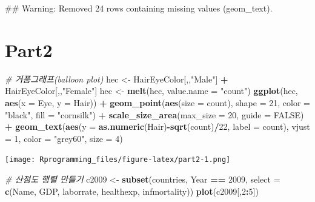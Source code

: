 \documentclass[10pt,]{krantz}
\makeatletter
\newenvironment{Shaded}{\begin{snugshade}}{\end{snugshade}}
\newcommand{\KeywordTok}[1]{\textcolor[rgb]{0.13,0.29,0.53}{\textbf{#1}}}
\newcommand{\DataTypeTok}[1]{\textcolor[rgb]{0.13,0.29,0.53}{#1}}
\newcommand{\DecValTok}[1]{\textcolor[rgb]{0.00,0.00,0.81}{#1}}
\newcommand{\StringTok}[1]{\textcolor[rgb]{0.31,0.60,0.02}{#1}}
\newcommand{\CommentTok}[1]{\textcolor[rgb]{0.56,0.35,0.01}{\textit{#1}}}
\newcommand{\OtherTok}[1]{\textcolor[rgb]{0.56,0.35,0.01}{#1}}
\newcommand{\OperatorTok}[1]{\textcolor[rgb]{0.81,0.36,0.00}{\textbf{#1}}}
\newcommand{\NormalTok}[1]{#1}
\newenvironment{kframe}{%
\medskip{}
\setlength{\fboxsep}{.8em}
 \def\at@end@of@kframe{}%
 \ifinner\ifhmode%
  \def\at@end@of@kframe{\end{minipage}}%
  \begin{minipage}{\columnwidth}%
 \fi\fi%
 \def\FrameCommand##1{\hskip\@totalleftmargin \hskip-\fboxsep
 \colorbox{shadecolor}{##1}\hskip-\fboxsep
     \hskip-\linewidth \hskip-\@totalleftmargin \hskip\columnwidth}%
 \MakeFramed {\advance\hsize-\width
   \@totalleftmargin\z@ \linewidth\hsize
   \@setminipage}}%
 {\par\unskip\endMakeFramed%
 \at@end@of@kframe}
\renewenvironment{Shaded}{\begin{kframe}}{\end{kframe}}
\theoremstyle{definition}
\theoremstyle{definition}
\theoremstyle{remark}
\makeatother
\begin{document}
\begin{Shaded}
\begin{Highlighting}[]
\NormalTok{## Warning: Removed 24 rows containing missing values (geom_text).}
\end{Highlighting}
\end{Shaded}

\section{Part2}\label{part2}

\begin{Shaded}
\begin{Highlighting}[]

\CommentTok{# 거품그래프(balloon plot)}
\NormalTok{hec <-}\StringTok{ }\NormalTok{HairEyeColor[,,}\StringTok{"Male"}\NormalTok{] }\OperatorTok{+}\StringTok{ }\NormalTok{HairEyeColor[,,}\StringTok{"Female"}\NormalTok{]}
\NormalTok{hec <-}\StringTok{ }\KeywordTok{melt}\NormalTok{(hec, }\DataTypeTok{value.name =} \StringTok{"count"}\NormalTok{) }
\KeywordTok{ggplot}\NormalTok{(hec, }\KeywordTok{aes}\NormalTok{(}\DataTypeTok{x =}\NormalTok{ Eye, }\DataTypeTok{y =}\NormalTok{ Hair)) }\OperatorTok{+}\StringTok{ }\KeywordTok{geom_point}\NormalTok{(}\KeywordTok{aes}\NormalTok{(}\DataTypeTok{size =}\NormalTok{ count), }\DataTypeTok{shape =} \DecValTok{21}\NormalTok{, }\DataTypeTok{color =} \StringTok{"black"}\NormalTok{, }\DataTypeTok{fill =} \StringTok{"cornsilk"}\NormalTok{) }\OperatorTok{+}\StringTok{ }
\StringTok{  }\KeywordTok{scale_size_area}\NormalTok{(}\DataTypeTok{max_size =} \DecValTok{20}\NormalTok{, }\DataTypeTok{guide =} \OtherTok{FALSE}\NormalTok{) }\OperatorTok{+}\StringTok{ }
\StringTok{  }\KeywordTok{geom_text}\NormalTok{(}\KeywordTok{aes}\NormalTok{(}\DataTypeTok{y =} \KeywordTok{as.numeric}\NormalTok{(Hair)}\OperatorTok{-}\KeywordTok{sqrt}\NormalTok{(count)}\OperatorTok{/}\DecValTok{22}\NormalTok{, }\DataTypeTok{label =}\NormalTok{ count), }\DataTypeTok{vjust =} \DecValTok{1}\NormalTok{, }\DataTypeTok{color =} \StringTok{"grey60"}\NormalTok{, }\DataTypeTok{size =} \DecValTok{4}\NormalTok{)}
\end{Highlighting}
\end{Shaded}

\texttt{[image: Rprogramming\_files/figure-latex/part2-1.png]}

\begin{Shaded}
\begin{Highlighting}[]


\CommentTok{# 산점도 행렬 만들기}
\NormalTok{c2009 <-}\StringTok{ }\KeywordTok{subset}\NormalTok{(countries, Year }\OperatorTok{==}\StringTok{ }\DecValTok{2009}\NormalTok{, }\DataTypeTok{select =} \KeywordTok{c}\NormalTok{(Name, GDP, laborrate, healthexp, infmortality)) }
\KeywordTok{plot}\NormalTok{(c2009[,}\DecValTok{2}\OperatorTok{:}\DecValTok{5}\NormalTok{])}
\end{Highlighting}
\end{Shaded}
\end{document}
